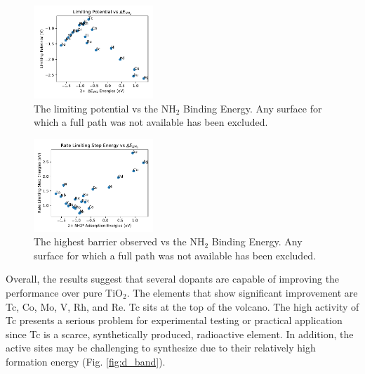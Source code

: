 \begin{figure}
    \centering
    \includegraphics[width=0.4\textwidth]{Images/NH2_v_limiting_pot.pdf}
    
    \caption{The limiting potential vs the NH$_2$ Binding Energy. Any surface for which a full path was not available has been excluded.}
    \label{fig:NH2_limiting_pot}
\end{figure}

\begin{figure}
    \centering
    \includegraphics[width=0.4\textwidth]{Images/NH2_v_rate_limiting.pdf}
    
    \caption{The highest barrier observed vs the NH$_2$ Binding Energy. Any surface for which a full path was not available has been excluded.}
    \label{fig:NH2_limiting_bar}
\end{figure}


Overall, the results suggest that several dopants are capable of improving the performance over pure TiO$_2$. The elements that show significant improvement are Tc, Co, Mo, V, Rh, and Re. Tc sits at the top of the volcano. The high activity of Tc presents a serious problem for experimental testing or practical application since Tc is a scarce, synthetically produced, radioactive element. In addition, the active sites may be challenging to synthesize due to their relatively high formation energy (Fig. \ref{fig:d_band}). 

